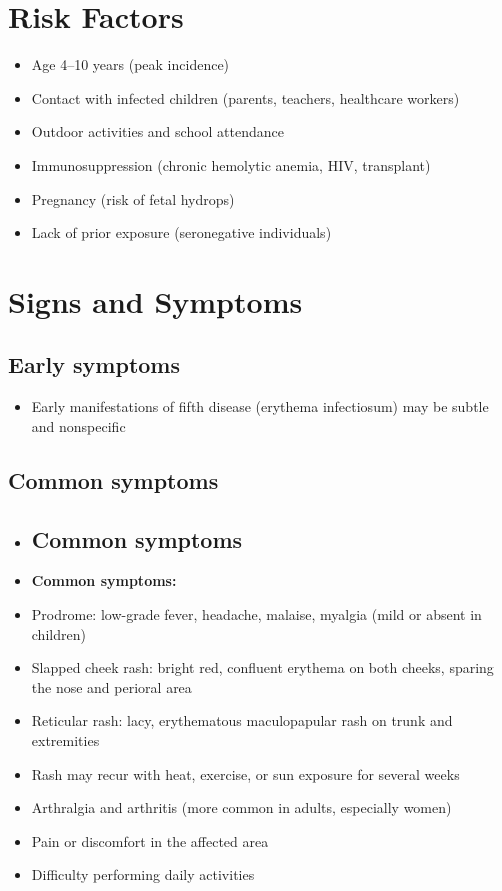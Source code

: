 \section{Risk Factors}

\begin{itemize}[noitemsep]
  \item Age 4--10 years (peak incidence)
  \item Contact with infected children (parents, teachers, healthcare workers)
  \item Outdoor activities and school attendance
  \item Immunosuppression (chronic hemolytic anemia, HIV, transplant)
  \item Pregnancy (risk of fetal hydrops)
  \item Lack of prior exposure (seronegative individuals)
\end{itemize}

\section{Signs and Symptoms}

\subsection{Early symptoms}
\begin{itemize}[noitemsep]
  \item Early manifestations of fifth disease (erythema infectiosum) may be subtle and nonspecific
\end{itemize}

\subsection{Common symptoms}
\begin{itemize}[noitemsep]
  \item \subsection{Common symptoms}
  \item \textbf{Common symptoms:}
  \item Prodrome: low-grade fever, headache, malaise, myalgia (mild or absent in children)
  \item Slapped cheek rash: bright red, confluent erythema on both cheeks, sparing the nose and perioral area
  \item Reticular rash: lacy, erythematous maculopapular rash on trunk and extremities
  \item Rash may recur with heat, exercise, or sun exposure for several weeks
  \item Arthralgia and arthritis (more common in adults, especially women)
  \item Pain or discomfort in the affected area
  \item Difficulty performing daily activities
\end{itemize}

